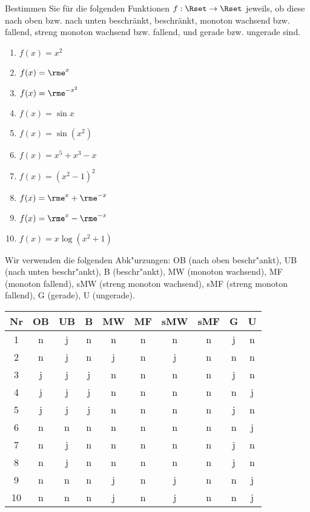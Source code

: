 \documentclass[11pt,answers]{exam}
\begin{document}
\begin{questions}


% 

Bestimmen Sie für die folgenden Funktionen $f:\Rset\to\Rset$ jeweils, ob diese nach oben bzw. nach unten beschränkt, beschränkt, monoton wachsend bzw. fallend, streng monoton wachsend bzw. fallend, und gerade bzw. ungerade sind.\\
\parbox{0.4\textwidth}{\begin{enumerate}
\item $f(x)=x^2$
\item $f(x)=\rme^x$
\item $f(x)=\rme^{-x^2}$
\item $f(x)=\sin x$
\item $f(x)=\sin (x^2)$
\end{enumerate}}\parbox{0.6\textwidth}{\begin{enumerate}\setcounter{enumi}{5}
\item $f(x)=x^5+x^3-x$
\item $f(x)=(x^2-1)^2$
\item $f(x)=\rme^x+\rme^{-x}$
\item $f(x)=\rme^x-\rme^{-x}$
\item $f(x)=x\log(x^2+1)$
\end{enumerate}}
\begin{solution} Wir verwenden die folgenden Abk"urzungen: OB (nach oben beschr"ankt), UB (nach unten beschr"ankt), B (beschr"ankt), MW (monoton wachsend), MF (monoton fallend), sMW (streng monoton wachsend), sMF (streng monoton fallend), G (gerade), U (ungerade).
\begin{center}
\begin{tabular}{|c|c|c|c|c|c|c|c|c|c|}
\hline
Nr & OB & UB & B & MW & MF & sMW & sMF & G & U\\
\hline
1 & n & j & n & n & n & n & n & j & n \\
\hline
2 & n & j & n & j & n & j & n & n & n \\
\hline
3 & j & j & j & n & n & n & n & j & n \\
\hline
4 & j & j & j & n & n & n & n & n & j \\
\hline
5 & j & j & j & n & n & n & n & j & n \\
\hline
6 & n & n & n & n & n & n & n & n & j \\
\hline
7 & n & j & n & n & n & n & n & j & n \\
\hline
8 & n & j & n & n & n & n & n & j & n \\
\hline
9 & n & n & n & j & n & j & n & n & j \\
\hline
10 & n & n & n & j & n & j & n & n & j \\
\hline
\end{tabular}
\end{center}
\end{solution}




\end{questions}
\end{document}
